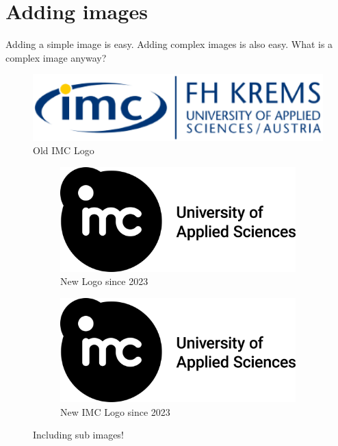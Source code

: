 \documentclass{imc-inf}
\begin{document}
\section{Adding images}
Adding a simple image is easy. Adding complex images is also easy. What is a complex image anyway? 
\begin{figure}[h!]
	\centering
	\includegraphics[width=1.0\textwidth]{imclogo.png}
	\caption{Old IMC Logo}
	\label{fig:logo}
\end{figure}





\begin{figure}[ht]
	\begin{subfigure}{.5\textwidth}
		\centering
		\includegraphics[width=.8\linewidth]{imc_logo_print.jpg}  
		\caption{New Logo since 2023}
		\label{fig:sub-first}
	\end{subfigure}
	\begin{subfigure}{.5\textwidth}
		\centering
		\includegraphics[width=.8\linewidth]{imc_logo_print.jpg}  
		\caption{New IMC Logo since 2023}
		\label{fig:sub-second}
	\end{subfigure}
	\caption{Including sub images! }
	\label{fig:fig}
\end{figure}
\end{document}
